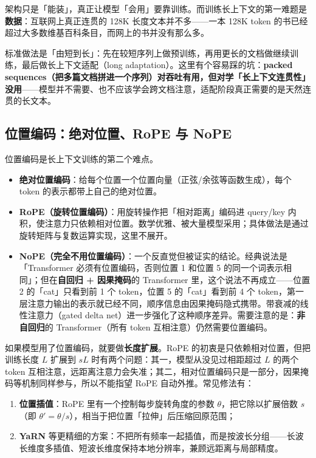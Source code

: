 \documentclass[a4paper]{article}
\begin{document}
架构只是「能装」，真正让模型「会用」要靠训练。而训练长上下文的第一难题是\textbf{数据}：互联网上真正连贯的 128K 长度文本并不多——一本 128K token 的书已经超过大多数维基百科条目，而网上的书并没有那么多。

标准做法是「由短到长」：先在较短序列上做预训练，再用更长的文档做继续训练，最后做长上下文适配（long adaptation）。这里有个容易踩的坑：\textbf{packed sequences（把多篇文档拼进一个序列）对吞吐有用，但对学「长上下文连贯性」没用}——模型并不需要、也不应该学会跨文档注意，适配阶段真正需要的是天然连贯的长文本。

\subsection{位置编码：绝对位置、RoPE 与 NoPE}

位置编码是长上下文训练的第二个难点。

\begin{itemize}
\item \textbf{绝对位置编码}：给每个位置一个位置向量（正弦/余弦等函数生成），每个 token 的表示都带上自己的绝对位置。
\item \textbf{RoPE（旋转位置编码）}：用旋转操作把「相对距离」编码进 query/key 内积，使注意力只依赖相对位置。数学优雅、被大量模型采用；具体做法是通过旋转矩阵与复数运算实现，这里不展开。
\item \textbf{NoPE（完全不用位置编码）}：一个反直觉但被证实的结论。经典说法是「Transformer 必须有位置编码，否则位置 1 和位置 5 的同一个词表示相同」；但在\textbf{自回归 + 因果掩码}的 Transformer 里，这个说法不再成立——位置 2 的「cat」只看到前 1 个 token，位置 5 的「cat」看到前 4 个 token，第一层注意力输出的表示就已经不同，顺序信息由因果掩码隐式携带。带衰减的线性注意力（gated delta net）进一步强化了这种顺序差异。需要注意的是：\textbf{非自回归}的 Transformer（所有 token 互相注意）仍然需要位置编码。
\end{itemize}

如果模型用了位置编码，就要做\textbf{长度扩展}。RoPE 的初衷是只依赖相对位置，但把训练长度 $L$ 扩展到 $sL$ 时有两个问题：其一，模型从没见过相距超过 $L$ 的两个 token 互相注意，远距离注意力会失准；其二，相对位置编码只是一部分，因果掩码等机制同样参与，所以不能指望 RoPE 自动外推。常见修法有：

\begin{enumerate}
\item \textbf{位置插值}：RoPE 里有一个控制每步旋转角度的参数 $\theta$，把它除以扩展倍数 $s$（即 $\theta' = \theta/s$），相当于把位置「拉伸」后压缩回原范围；
\item \textbf{YaRN} 等更精细的方案：不把所有频率一起插值，而是按波长分组——长波长维度多插值、短波长维度保持本地分辨率，兼顾远距离与局部精度。
\end{enumerate}
\end{document}
